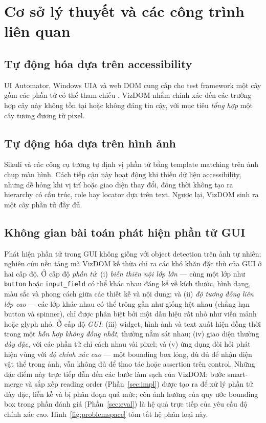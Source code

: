 \documentclass[11pt,a4paper]{article}
\newcommand{\code}[1]{\texttt{#1}}
\begin{document}
\section{Cơ sở lý thuyết và các công trình liên quan}

\subsection{Tự động hóa dựa trên accessibility}
UI Automator, Windows UIA và web DOM cung cấp cho test framework một cây gồm các
phần tử có thể tham chiếu \cite{uiautomator,appium}. VizDOM nhắm chính xác đến các
trường hợp cây này không tồn tại hoặc không đáng tin cậy, với mục tiêu
\emph{tổng hợp} một cây tương đương từ pixel.

\subsection{Tự động hóa dựa trên hình ảnh}
Sikuli và các công cụ tương tự \cite{yeh2009sikuli} định vị phần tử bằng template
matching trên ảnh chụp màn hình. Cách tiếp cận này hoạt động khi thiếu dữ liệu
accessibility, nhưng dễ hỏng khi vị trí hoặc giao diện thay đổi, đồng thời không tạo
ra hierarchy có cấu trúc, role hay locator dựa trên text. Ngược lại, VizDOM sinh ra
một cây phần tử đầy đủ.

\subsection{Không gian bài toán phát hiện phần tử GUI}
Phát hiện phần tử trong GUI không giống với object detection trên ảnh tự nhiên;
nghiên cứu nền tảng mà VizDOM kế thừa \cite{xie2020uied} chỉ ra các khó khăn đặc thù
của GUI ở hai cấp độ. Ở cấp độ \emph{phần tử}: (i) \emph{biến thiên nội lớp lớn}
--- cùng một lớp như \code{button} hoặc \code{input\_field} có thể khác nhau đáng
kể về kích thước, hình dạng, màu sắc và phong cách giữa các thiết kế và nội dung;
và (ii) \emph{độ tương đồng liên lớp cao} --- các lớp khác nhau có thể trông gần
như giống hệt nhau (chẳng hạn button và spinner), chỉ được phân biệt bởi một dấu
hiệu rất nhỏ như viền mảnh hoặc glyph nhỏ. Ở cấp độ \emph{GUI}: (iii) widget, hình
ảnh và text xuất hiện đồng thời trong một \emph{hỗn hợp không đồng nhất}, thường nằm
sát nhau; (iv) giao diện thường \emph{dày đặc}, với các phần tử chỉ cách nhau vài
pixel; và (v) ứng dụng đòi hỏi phát hiện vùng với \emph{độ chính xác cao} --- một
bounding box lỏng, dù đủ để nhận diện vật thể trong ảnh, vẫn không đủ để thao tác
hoặc assertion trên control. Những đặc điểm này trực tiếp dẫn đến các bước làm sạch
của VizDOM: bước smart-merge và sắp xếp reading order (Phần~\ref{sec:impl}) được tạo
ra để xử lý phần tử dày đặc, liền kề và bị phân đoạn quá mức; còn ảnh hưởng của quy
ước bounding box trong phần đánh giá (Phần~\ref{sec:eval}) là hệ quả trực tiếp của
yêu cầu độ chính xác cao. Hình~\ref{fig:problemspace} tóm tắt hệ phân loại này.
\end{document}
